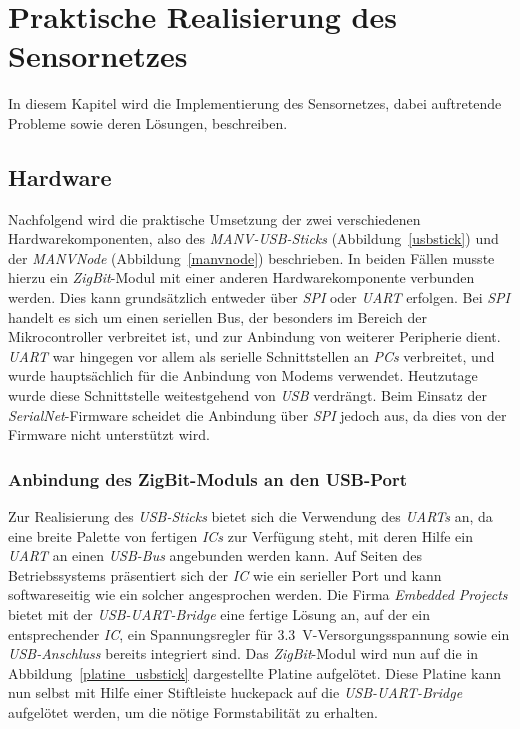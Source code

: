 
\chapter{Praktische Realisierung des Sensornetzes}\label{Implementierung}

In diesem Kapitel wird die Implementierung des Sensornetzes, dabei auftretende Probleme sowie deren Lösungen, beschreiben.

\section{Hardware}
Nachfolgend wird die praktische Umsetzung der zwei verschiedenen Hardwarekomponenten, also des \emph{MANV-USB-Sticks} 
(Abbildung~\ref{usbstick}) und der
\emph{MANVNode} (Abbildung~\ref{manvnode}) beschrieben. In beiden Fällen musste hierzu ein \emph{ZigBit}-Modul mit einer anderen 
Hardwarekomponente verbunden werden. Dies kann grundsätzlich entweder über \emph{SPI} oder \emph{UART} erfolgen.
Bei \emph{SPI} handelt es sich um einen seriellen Bus, der besonders im Bereich der Mikrocontroller verbreitet ist,
und zur Anbindung von weiterer Peripherie dient. \emph{UART} war hingegen vor allem als serielle Schnittstellen
an \emph{PCs} verbreitet, und wurde hauptsächlich für die Anbindung von Modems verwendet. Heutzutage wurde diese
Schnittstelle weitestgehend von \emph{USB} verdrängt. Beim Einsatz der \emph{SerialNet}-Firmware scheidet die
Anbindung über \emph{SPI} jedoch aus, da dies von der Firmware nicht unterstützt wird.

\subsection{Anbindung des ZigBit-Moduls an den USB-Port}
Zur Realisierung des \emph{USB-Sticks} bietet sich die Verwendung des \emph{UARTs} an, da eine breite Palette 
von fertigen \emph{ICs} zur Verfügung steht, mit deren Hilfe ein \emph{UART} an einen \emph{USB-Bus} angebunden werden 
kann. Auf Seiten des Betriebssystems präsentiert sich der \emph{IC} wie ein serieller Port und kann softwareseitig
wie ein solcher angesprochen werden. Die Firma \emph{Embedded Projects} bietet mit der \emph{USB-UART-Bridge}
eine fertige Lösung an, auf der ein entsprechender \emph{IC}, ein Spannungsregler für 3.3~V-Versorgungsspannung
sowie ein \emph{USB-Anschluss} bereits integriert sind. Das \emph{ZigBit}-Modul wird nun auf die in 
Abbildung~\ref{platine_usbstick} dargestellte Platine aufgelötet. Diese Platine kann nun selbst mit Hilfe einer
Stiftleiste huckepack auf die \emph{USB-UART-Bridge} aufgelötet werden, um die nötige Formstabilität zu erhalten.

